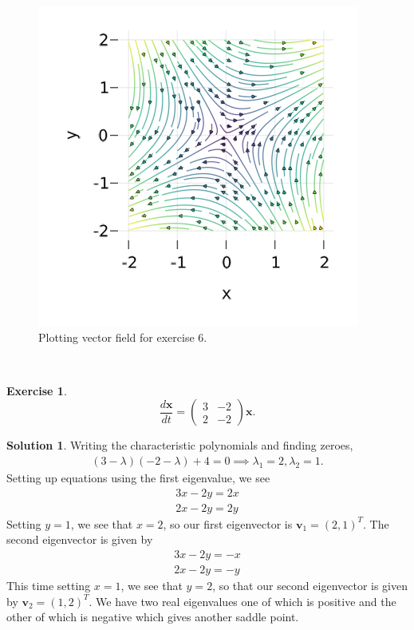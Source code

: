 \documentclass[12pt]{article}
\renewcommand{\vec}[1]{\mathbf{#1}}
\theoremstyle{definition}
\newtheorem{exer}{Exercise}
\newtheorem{sol}{Solution}
\theoremstyle{remark}
\begin{document}
  \begin{figure}[h]
     \centering
     \includegraphics[width=0.8\linewidth]{figs/hw-1-exer-6.png}
     \caption{Plotting vector field for exercise 6.}%
     \label{fig:exer-6}
 \end{figure}

\newpage

\

\newpage 

\begin{exer}
\begin{equation*}
\frac{d \vec{x}}{dt} 
=
\begin{pmatrix}
    3 & -2\\
    2 & -2
\end{pmatrix}
\vec{x}.
\end{equation*}
\end{exer}

\begin{sol}\leavevmode
    Writing the characteristic polynomials and finding zeroes,
    \begin{align*}
        (3 -\lambda)(-2 - \lambda) + 4 = 0 \implies \lambda_{1} = 2, \lambda_{2} = 1.
    \end{align*}
    Setting up equations using the first eigenvalue, we see
    \begin{align*}
        3x  -2 y = 2x\\
        2x - 2y = 2y
    \end{align*}
    Setting $y = 1$, we see that $x = 2$, so our first eigenvector is $\vec{v}_{1} = (2,1)^{T}$. The second eigenvector is given by
    \begin{align*}
        3x  -2 y = -x\\
        2x - 2y = -y
    \end{align*}
    This time setting $x = 1$, we see that $y = 2$, so that our second eigenvector is given by $\vec{v}_{2} = (1, 2)^{T}$. We have two real eigenvalues one of which is positive and the other of which is negative which gives another saddle point.
 \end{sol}
\end{document}
